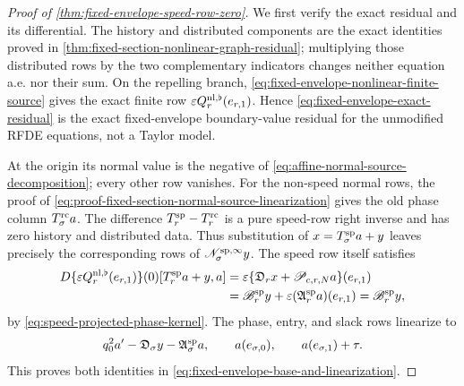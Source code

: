 \begin{proof}[Proof of
\cref{thm:fixed-envelope-speed-row-zero}]
We first verify the exact residual and its differential.  The history and
distributed components are the exact identities proved in
\cref{thm:fixed-section-nonlinear-graph-residual}; multiplying those
distributed rows by the two complementary indicators changes neither
equation a.e. nor their sum.  On the repelling branch,
\cref{eq:fixed-envelope-nonlinear-finite-source} gives the exact finite
row \(\varepsilon Q_r^{\rm nl,\flat}(e_{r,1})\).  Hence
\cref{eq:fixed-envelope-exact-residual} is the exact fixed-envelope
boundary-value residual for the unmodified RFDE equations, not a Taylor
model.

At the origin its normal value is the negative of
\cref{eq:affine-normal-source-decomposition}; every other row vanishes.
For the non-speed normal rows, the proof of
\cref{eq:proof-fixed-section-normal-source-linearization} gives the
old phase column \(T_\sigma^{\rm rc}a\).  The difference
\(T_r^{\rm sp}-T_r^{\rm rc}\) is a pure speed-row right inverse and has
zero history and distributed data.  Thus substitution of
\(x=T_\sigma^{\rm sp}a+y\) leaves precisely the corresponding rows of
\(\mathscr N_\sigma^{\rm sp,\infty}y\).  The speed row itself satisfies
\begin{align*}
 D\{\varepsilon Q_r^{\rm nl,\flat}(e_{r,1})\}(0)
       [T_r^{\rm sp}a+y,a]
 &=\varepsilon\{\mathfrak D_rx
             +\mathscr P_{c,r,N}a\}(e_{r,1})\\
 &=\mathscr B_r^{\rm sp}y
       +\varepsilon(\mathfrak A_r^{\rm sp}a)(e_{r,1})
 =\mathscr B_r^{\rm sp}y,
\end{align*}
by \cref{eq:speed-projected-phase-kernel}.  The phase, entry, and slack
rows linearize to
\[
 q_0^2a'-\mathfrak D_\sigma y
       -\mathfrak A_\sigma^{\rm sp}a,\qquad
 a(e_{\sigma,0}),\qquad a(e_{\sigma,1})+\tau.
\]
This proves both identities in
\cref{eq:fixed-envelope-base-and-linearization}.


\end{proof}
